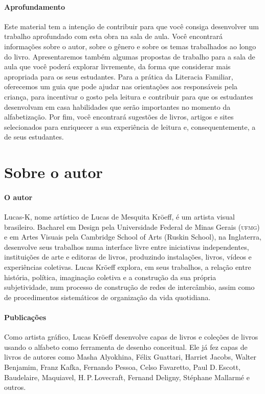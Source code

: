 \documentclass[11pt]{extarticle}
\begin{document}
\paragraph{Aprofundamento} 
Este material tem a intenção de contribuir para que você consiga desenvolver um trabalho aprofundado com esta obra na sala de aula. Você encontrará informações sobre o autor, sobre o gênero e sobre os temas trabalhados ao longo do livro. Apresentaremos também algumas propostas de trabalho para a sala de aula que você poderá explorar livremente, da forma que considerar mais apropriada para os seus estudantes. Para a prática da Literacia Familiar, oferecemos um guia que pode ajudar nas orientações aos responsáveis pela criança, para incentivar o gosto pela leitura e contribuir para que os estudantes desenvolvam em casa habilidades que serão importantes no momento da alfabetização. Por fim, você encontrará sugestões de livros, artigos e sites selecionados para enriquecer a sua experiência de leitura e, consequentemente, a de seus estudantes.


\section{Sobre o autor}


\paragraph{O autor} Lucas-K, nome artístico de Lucas de Mesquita Kröeff, é um artista visual brasileiro. Bacharel em Design pela Universidade Federal de Minas Gerais (\textsc{ufmg}) e em Artes Visuais pela Cambridge School of Arts (Ruskin School), na Inglaterra, desenvolve seus trabalhos numa interface livre entre iniciativas independentes, instituições de arte e editoras de livros, produzindo instalações, livros, vídeos e experiências coletivas.
Lucas Kröeff explora, em seus trabalhos, a relação entre história, política, imaginação coletiva e a construção da sua própria subjetividade, num processo de construção de redes de intercâmbio, assim como de procedimentos sistemáticos de organização da vida quotidiana.

\paragraph{Publicações} Como artista gráfico, Lucas Kröeff desenvolve capas de livros e coleções de livros usando o alfabeto como ferramenta de desenho conceitual. Ele já fez capas de livros de autores como Masha Alyokhina, Félix Guattari, Harriet Jacobs, Walter Benjamim, Franz Kafka, Fernando Pessoa, Celso Favaretto, Paul D.\,Escott, Baudelaire, Maquiavel, H.\,P.\,Lovecraft, Fernand Deligny, Stéphane Mallarmé e outros.
\end{document}
